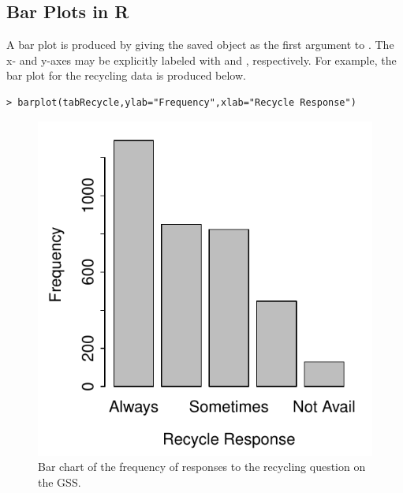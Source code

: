 \documentclass[10pt,openany]{book}\usepackage[]{graphicx}\usepackage[]{color}
\makeatletter
\newenvironment{kframe}{%
 \def\at@end@of@kframe{}%
 \ifinner\ifhmode%
  \def\at@end@of@kframe{\end{minipage}}%
  \begin{minipage}{\columnwidth}%
 \fi\fi%
 \def\FrameCommand##1{\hskip\@totalleftmargin \hskip-\fboxsep
 \colorbox{shadecolor}{##1}\hskip-\fboxsep
     \hskip-\linewidth \hskip-\@totalleftmargin \hskip\columnwidth}%
 \MakeFramed {\advance\hsize-\width
   \@totalleftmargin\z@ \linewidth\hsize
   \@setminipage}}%
 {\par\unskip\endMakeFramed%
 \at@end@of@kframe}
\newenvironment{knitrout}{}{} %
\makeatother
\begin{document}
\subsection{Bar Plots in R} \label{sect:BarChart}
\vspace{-12pt}
A bar plot is produced by giving the saved  object as the first argument to . The x- and y-axes may be explicitly labeled with  and , respectively.  For example, the bar plot for the recycling data  is produced below.
\begin{knitrout}
\color{fgcolor}\begin{kframe}
\begin{verbatim}
> barplot(tabRecycle,ylab="Frequency",xlab="Recycle Response")
\end{verbatim}
\end{kframe}\begin{figure}[hbtp]

{\centering \includegraphics[width=.55\linewidth]{Figs/Barchart1-1} 

}

\caption[Bar chart of the frequency of responses to the recycling question on the GSS]{Bar chart of the frequency of responses to the recycling question on the GSS.}\label{fig:Barchart1}
\end{figure}


\end{knitrout}
\end{document}
